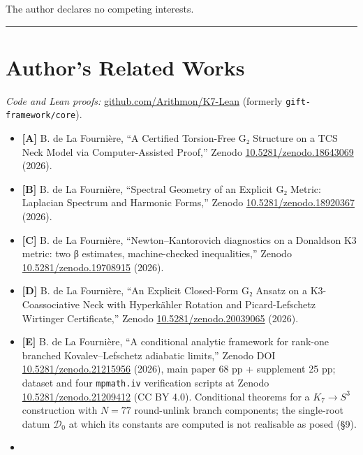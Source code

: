 \documentclass[11pt,a4paper]{article}
\begin{document}
The author declares no competing interests.

\begin{center}\rule{\linewidth}{0.5pt}\end{center}

\section{Author's Related Works}\label{authors-related-works}

\emph{Code and Lean proofs:} \href{https://github.com/Arithmon/K7-Lean}{github.com/Arithmon/K7-Lean} (formerly \texttt{gift-\allowbreak{}framework/\allowbreak{}core}).

\begin{itemize}
\tightlist
\item
  \textbf{{[}A{]}} B. de La Fournière, ``A Certified Torsion-Free G₂ Structure on a TCS Neck Model via Computer-Assisted Proof,'' Zenodo \href{https://doi.org/10.5281/zenodo.18643069}{10.5281/zenodo.18643069} (2026).
\item
  \textbf{{[}B{]}} B. de La Fournière, ``Spectral Geometry of an Explicit G₂ Metric: Laplacian Spectrum and Harmonic Forms,'' Zenodo \href{https://doi.org/10.5281/zenodo.18920367}{10.5281/zenodo.18920367} (2026).
\item
  \textbf{{[}C{]}} B. de La Fournière, ``Newton--Kantorovich diagnostics on a Donaldson K3 metric: two β estimates, machine-checked inequalities,'' Zenodo \href{https://doi.org/10.5281/zenodo.19708915}{10.5281/zenodo.19708915} (2026).
\item
  \textbf{{[}D{]}} B. de La Fournière, ``An Explicit Closed-Form G₂ Ansatz on a K3-Coassociative Neck with Hyperkähler Rotation and Picard-Lefschetz Wirtinger Certificate,'' Zenodo \href{https://doi.org/10.5281/zenodo.20039065}{10.5281/zenodo.20039065} (2026).
\item
  \textbf{{[}E{]}} B. de La Fournière, ``A conditional analytic framework for rank-one branched Kovalev--Lefschetz adiabatic limits,'' Zenodo DOI \href{https://doi.org/10.5281/zenodo.21215956}{10.5281/zenodo.21215956} (2026), main paper 68 pp + supplement 25 pp; dataset and four \texttt{mpmath.\allowbreak{}iv} verification scripts at Zenodo \href{https://doi.org/10.5281/zenodo.21209412}{10.5281/zenodo.21209412} (CC BY 4.0). Conditional theorems for a \(K_7 \to S^3\) construction with \(N = 77\) round-unlink branch components; the single-root datum \(\mathcal D_0\) at which its constants are computed is not realisable as posed (§9).
\item

\end{itemize}
\end{document}
